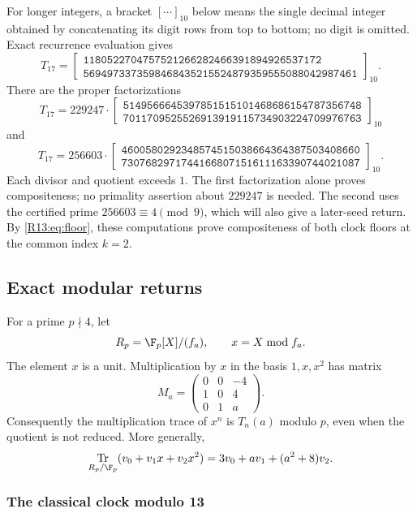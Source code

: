 \documentclass[11pt,a4paper]{article}
\theoremstyle{definition}\newtheorem{definition}[theorem]{Definition}
\theoremstyle{remark}\newtheorem{remark}[theorem]{Remark}
\newcommand{\decrows}[2]{\left[\begin{gathered}\mathtt{#1}\\[-2pt]\mathtt{#2}\end{gathered}\right]_{10}}
\DeclareMathOperator{\Tr}{Tr}\DeclareMathOperator{\tr}{tr}\DeclareMathOperator{\Nm}{N}
\begin{document}
For longer integers, a bracket $[\cdots]_{10}$ below means the
single decimal integer obtained by concatenating its digit rows
from top to bottom; no digit is omitted.
Exact recurrence evaluation gives
\begin{equation}\label{R13:eq:T17}
 T_{17}=\decrows{1180522704757521266282466391894926537172}
                    {5694973373598468435215524879359555088042987461}.
\end{equation}
There are the proper factorizations
\begin{equation}\label{R13:eq:factor17a}
 T_{17}=229247\cdot
 \decrows{5149566645397851515101468686154787356748}
         {7011709525526913919115734903224709976763}
\end{equation}
and
\begin{equation}\label{R13:eq:factor17b}
 T_{17}=256603\cdot
 \decrows{4600580292348574515038664364387503408660}
         {7307682971744166807151611163390744021087}.
\end{equation}
Each divisor and quotient exceeds $1$.
The first factorization alone proves compositeness; no primality
assertion about $229247$ is needed.
The second uses the certified prime $256603\equiv4\pmod9$,
which will also give a later-seed return.
By \eqref{R13:eq:floor}, these computations prove compositeness of
both clock floors at the common index $k=2$.

\subsection{Exact modular returns}

For a prime $p\nmid4$, let
\[
 R_p=\F_p[X]/(f_a),\qquad x=X\bmod f_a.
\]
The element $x$ is a unit. Multiplication by $x$ in the basis
$1,x,x^2$ has matrix
\[
 M_a=\begin{pmatrix}0&0&-4\\1&0&4\\0&1&a\end{pmatrix}.
\]
Consequently the multiplication trace of $x^n$ is $T_n(a)$ modulo $p$,
even when the quotient is not reduced. More generally,
\begin{equation}\label{R13:eq:ringtrace}
 \Tr_{R_p/\F_p}(v_0+v_1x+v_2x^2)
       =3v_0+av_1+(a^2+8)v_2.
\end{equation}

\subsubsection{The classical clock modulo 13}
\end{document}
